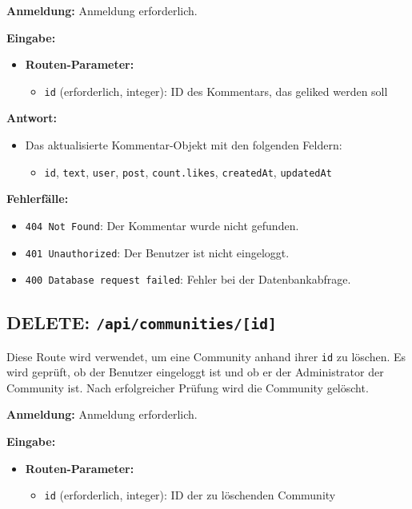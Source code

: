 \documentclass[a4paper,12pt]{article}
\begin{document}
\textbf{Anmeldung:} Anmeldung erforderlich.

\textbf{Eingabe:}
\begin{itemize}
    \item \textbf{Routen-Parameter:}
    \begin{itemize}
        \item \texttt{id} (erforderlich, integer): ID des Kommentars, das geliked werden soll
    \end{itemize}
\end{itemize}

\textbf{Antwort:}
\begin{itemize}
    \item Das aktualisierte Kommentar-Objekt mit den folgenden Feldern:
    \begin{itemize}
        \item \texttt{id}, \texttt{text}, \texttt{user}, \texttt{post}, \texttt{count.likes}, \texttt{createdAt}, \texttt{updatedAt}
    \end{itemize}
\end{itemize}

\textbf{Fehlerfälle:}
\begin{itemize}
    \item \texttt{404 Not Found}: Der Kommentar wurde nicht gefunden.
    \item \texttt{401 Unauthorized}: Der Benutzer ist nicht eingeloggt.
    \item \texttt{400 Database request failed}: Fehler bei der Datenbankabfrage.
\end{itemize}

\newpage
\subsection{DELETE: \texttt{/api/communities/[id]}}

Diese Route wird verwendet, um eine Community anhand ihrer \texttt{id} zu löschen. Es wird geprüft, ob der Benutzer eingeloggt ist und ob er der Administrator der Community ist. Nach erfolgreicher Prüfung wird die Community gelöscht.

\textbf{Anmeldung:} Anmeldung erforderlich.

\textbf{Eingabe:}
\begin{itemize}
    \item \textbf{Routen-Parameter:}
    \begin{itemize}
        \item \texttt{id} (erforderlich, integer): ID der zu löschenden Community
    \end{itemize}
\end{itemize}
\end{document}
